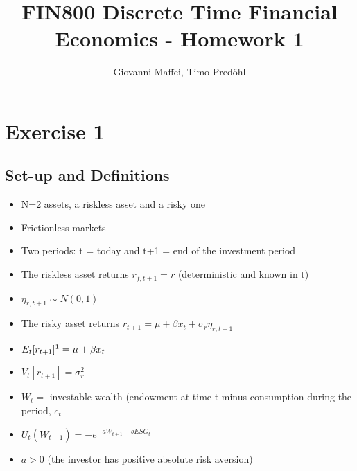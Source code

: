 \documentclass[12pt]{article}
\title{FIN800 Discrete Time Financial Economics - Homework 1}
\author{Giovanni Maffei, Timo Predöhl}
\begin{document}
	
	\maketitle
	
	\begin{spacing}{1}
		\tableofcontents		
	\end{spacing}
	\pagebreak
	
	\section{Exercise 1}
	\subsection{Set-up and Definitions}
	\begin{itemize}
		\item N=2 assets, a riskless asset and a risky one
		\item Frictionless markets
		\item Two periods: t = today and t+1 = end of the investment period 
		\item The riskless asset returns $r_{f,t+1} = r$ (deterministic and known in t)
		\item $\eta_{r, t+1} \sim N(0,1)$
		\item The risky asset returns $r_{t+1} = \mu + \beta x_t + \sigma_r \eta_{r, t+1}$
		\item $E_{t}[r_{t+1}]\footnote {The derivation of the Expected Value and of the Variance of the risky asset is in Appendix 1.} = \mu + \beta x_t$
		\item $V_{t}[r_{t+1}] = \sigma_r^2$
		\item $W_{t} = $ investable wealth  (endowment at time t minus consumption during the period, $c_t$
		\item  $U_{t}(W_{t+1}) = -e^{-aW_{t+1}-bESG_t}$
		\item $a > 0 $ (the investor has positive absolute risk aversion)
		
	\end{itemize}
	
\end{document}
